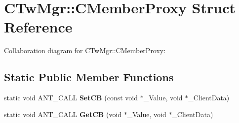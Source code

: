 \hypertarget{struct_c_tw_mgr_1_1_c_member_proxy}{\section{C\+Tw\+Mgr\+:\+:C\+Member\+Proxy Struct Reference}
\label{struct_c_tw_mgr_1_1_c_member_proxy}
}


Collaboration diagram for C\+Tw\+Mgr\+:\+:C\+Member\+Proxy\+:
\subsection*{Static Public Member Functions}
\begin{DoxyCompactItemize}
\item 
\hypertarget{struct_c_tw_mgr_1_1_c_member_proxy_a08f13d98b717ba5d53575be88003f640}{static void A\+N\+T\+\_\+\+C\+A\+L\+L {\bfseries Set\+C\+B} (const void $\ast$\+\_\+\+Value, void $\ast$\+\_\+\+Client\+Data)}\label{struct_c_tw_mgr_1_1_c_member_proxy_a08f13d98b717ba5d53575be88003f640}

\item 
\hypertarget{struct_c_tw_mgr_1_1_c_member_proxy_a5857640ec63fea4d4f36b34b752c5cad}{static void A\+N\+T\+\_\+\+C\+A\+L\+L {\bfseries Get\+C\+B} (void $\ast$\+\_\+\+Value, void $\ast$\+\_\+\+Client\+Data)}\label{struct_c_tw_mgr_1_1_c_member_proxy_a5857640ec63fea4d4f36b34b752c5cad}

\end{DoxyCompactItemize}
